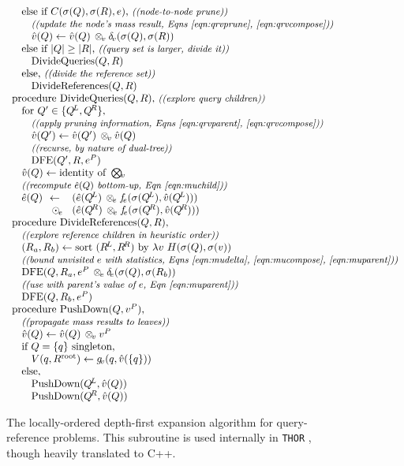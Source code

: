 \documentclass[twoside,leqno,twocolumn]{article}
\newcommand{\THOR}{{{\tt THOR}} }
\newcommand{\com}[1]{{\small \textit{((#1))}}}
\newcommand{\summary}{\delta}
\newcommand{\psty}{}
\newcommand{\X}{\\ \psty}
\newcommand{\x}{\X \hspace{0.13in}}
\newcommand{\xx}{\X \hspace{0.26in}}
\newcommand{\kdroot}[1]{#1^{\text{root}}}
\newcommand{\kdleft}[1]{#1^{\!L}}
\newcommand{\kdright}[1]{#1^{\!R}}
\newcommand{\nameOp}[2]{\mathop{#1\nolimits\!\!_{#2}}}
\newcommand{\nameop}[2]{{\scriptstyle\:}#1_{\!#2}}
\newcommand{\myOp}[1]{\nameOp{\bigotimes}{#1}}
\newcommand{\myop}[1]{\nameop{\otimes}{#1}}
\newcommand{\letterqr}{v}
\newcommand{\outqr}{V}
\newcommand{\Opqr}{\myOp{\letterqr}}
\newcommand{\opqr}{\myop{\letterqr}}
\newcommand{\gqr}{g_{\!\letterqr}}
\newcommand{\letterqrv}{v}
\newcommand{\deltaqrv}{\summary_{\!\letterqrv}}
\newcommand{\varqrv}{\hat{\letterqrv}}
\newcommand{\varqrvparent}{\letterqrv^{P}}
\newcommand{\lettermu}{e}
\newcommand{\outopmu}{\:\odot_{\!\lettermu}\:}
\newcommand{\opmu}{\myop{\lettermu}}
\newcommand{\fmuv}{f_{\!\lettermu}}
\newcommand{\deltamu}{\summary_{\!\lettermu}}
\newcommand{\canprunemu}{C}
\newcommand{\heurqr}{H}
\newcommand{\varmuchild}{\hat{\lettermu}}
\newcommand{\varmuparent}{\lettermu^{P}}
\newcommand{\outstat}{\sigma}
\begin{document}
\begin{figure}
\[\begin{array}[t]{l}
    \x \text{else if } \canprunemu(\outstat(Q), \outstat(R), \lettermu)\text{, \com{node-to-node prune}}
    \xx \text{\com{update the node's mass result, Eqns \ref{eqn:qrvprune}, \ref{eqn:qrvcompose}}}
    \xx \varqrv(Q) \gets \varqrv(Q) \opqr \deltaqrv(\outstat(Q), \outstat(R))
    \x \text{else if } |Q| \geq |R|\text{, \com{query set is larger, divide it}}
    \xx \text{DivideQueries}(Q, R)
    \x \text{else, \com{divide the reference set}}
    \xx \text{DivideReferences}(Q, R)
    \X \text{procedure DivideQueries}(Q, R)\text{, \com{explore query children}}
    \x \text{for } Q' \in \{\kdleft{Q}, \kdright{Q}\}\text{,}
    \xx \text{\com{apply pruning information, Eqns \ref{eqn:qrvparent}, \ref{eqn:qrvcompose}}}
    \xx \varqrv(Q') \gets \varqrv(Q') \opqr \varqrv(Q)
    \xx \text{\com{recurse, by nature of dual-tree}}
    \xx \text{DFE}(Q', R, \varmuparent)
    \x \varqrv(Q) \gets \text{identity of }\Opqr
    \x \text{\com{recompute $\varmuchild(Q)$ bottom-up, Eqn~\ref{eqn:muchild}}}
    \x \!\!\!\begin{array}{lll}
         \psty \varmuchild(Q) &\psty\!\!\gets\!\!&\psty (\varmuchild(\kdleft{Q})  \opmu \fmuv(\outstat(\kdleft{Q}), \varqrv(\kdleft{Q})))
         \\          &\psty\!\!\outopmu\!\!&\psty (\varmuchild(\kdright{Q}) \opmu \fmuv(\outstat(\kdright{Q}), \varqrv(\kdright{Q})))
        \end{array}
    \X \text{procedure DivideReferences}(Q, R)\text{,}
    \x \text{\com{explore reference children in heuristic order}}
    \x (R_a, R_b) \gets \text{sort }(\kdleft{R}, \kdright{R})\text{ by }\lambda v ~ \heurqr(\outstat(Q), \outstat(v))
    \x \text{\com{bound unvisited $\lettermu$ with statistics, Eqns \ref{eqn:mudelta}, \ref{eqn:mucompose}, \ref{eqn:muparent}}}
    \x \text{DFE}(Q, R_a, \varmuparent \opmu \deltamu(\outstat(Q), \outstat(R_b))
    \x \text{\com{use with parent's value of $\lettermu$, Eqn \ref{eqn:muparent}}}
    \x \text{DFE}(Q, R_b, \varmuparent)
    \X \text{procedure PushDown}(Q, \varqrvparent)\text{,}
    \x \text{\com{propagate mass results to leaves}}
    \x \varqrv(Q) \gets \varqrv(Q) \opqr \varqrvparent
    \x \text{if } Q = \{q\}\text{ singleton,}
    \xx \outqr(q, \kdroot{R}) \gets \gqr(q, \varqrv(\{q\}))
    \x \text{else,}
    \xx \text{PushDown}(\kdleft{Q}, \varqrv(Q))
    \xx \text{PushDown}(\kdright{Q}, \varqrv(Q))
  \end{array}
\]
\caption{\label{fig:DFE} The locally-ordered depth-first expansion algorithm for query-reference problems.
This subroutine is used internally in \THOR, though heavily translated to C++.
}
\end{figure}
\end{document}
